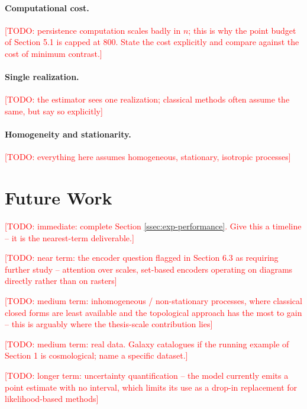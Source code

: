 \documentclass[11pt,letterpaper]{article}
\newcommand{\1}{\mathds{1}}
\newcommand{\todo}[1]{\textcolor{red}{[TODO: #1]}}
\newcommand{\fix}[1]{\textcolor{blue}{[FIX: #1]}}
\newcommand{\todo}[1]{}\newcommand{\fix}[1]{}
\theoremstyle{plain}
\theoremstyle{definitioncolon}
\begin{document}
\paragraph{Computational cost.}
\todo{persistence computation scales badly in $n$; this is why the point budget
of Section 5.1 is capped at 800. State the cost explicitly and compare against
the cost of minimum contrast.}

\paragraph{Single realization.}
\todo{the estimator sees one realization; classical methods often assume the
same, but say so explicitly}

\paragraph{Homogeneity and stationarity.}
\todo{everything here assumes homogeneous, stationary, isotropic processes}
\section{Future Work}

\todo{immediate: complete Section \ref{ssec:exp-performance}. Give this a
timeline -- it is the nearest-term deliverable.}

\todo{near term: the encoder question flagged in Section 6.3 as requiring
further study -- attention over scales, set-based encoders operating on diagrams
directly rather than on rasters}

\todo{medium term: inhomogeneous / non-stationary processes, where classical
closed forms are least available and the topological approach has the most to
gain -- this is arguably where the thesis-scale contribution lies}

\todo{medium term: real data. Galaxy catalogues if the running example of
Section 1 is cosmological; name a specific dataset.}

\todo{longer term: uncertainty quantification -- the model currently emits a
point estimate with no interval, which limits its use as a drop-in replacement
for likelihood-based methods}
\end{document}
